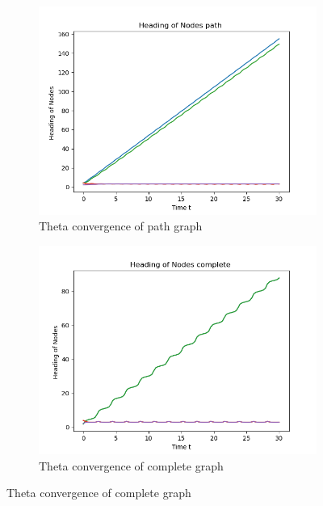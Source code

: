 \documentclass{article}
\begin{document}
\begin{problem}
\begin{figure}[!ht]
\begin{subfigure}{0.35\textwidth}
            \includegraphics[width=\textwidth]{./img/p3_path3.png}
            \caption{Theta convergence of path graph }
        \end{subfigure}
        \begin{subfigure}{0.35\textwidth}
            \includegraphics[width=\textwidth]{./img/p3_complete3.png}
            \caption{Theta convergence of complete graph }
        \end{subfigure}
    \end{figure}
\end{problem}
\end{document}
